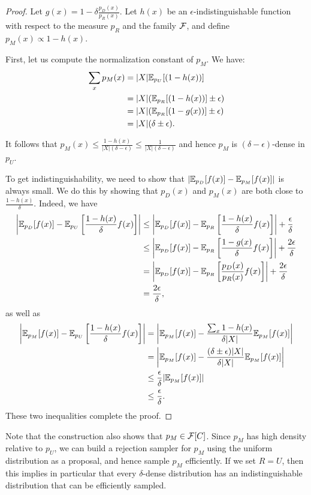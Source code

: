 \documentclass[11pt]{article}
\begin{document}
\begin{proof}
Let $g(x) = 1-\delta\frac{p_D(x)}{p_R(x)}$. Let $h(x)$ be an $\epsilon$-indistinguishable function 
with respect to the measure $p_R$ and the family $\mathcal{F}$, and define $p_M(x) \propto 1-h(x)$.

First, let us compute the normalization constant of $p_M$. We have:
\begin{align*}
\sum_{x} p_M(x) &= |X|\mathbb{E}_{p_U}[(1-h(x))] \\
 &= |X|(\mathbb{E}_{p_R}[(1-h(x))] \pm \epsilon) \\
 &= |X|(\mathbb{E}_{p_R}[(1-g(x))] \pm \epsilon) \\
 &= |X|(\delta \pm \epsilon).
\end{align*}

It follows that $p_M(x) \leq \frac{1-h(x)}{|X|(\delta-\epsilon)} \leq \frac{1}{|X|(\delta-\epsilon)}$ and 
hence $p_M$ is $(\delta-\epsilon)$-dense in $p_U$.

To get indistinguishability, we need to show that $|\mathbb{E}_{p_D}[f(x)]-\mathbb{E}_{p_M}[f(x)]|$ is always small. 
We do this by showing that $p_D(x)$ and $p_M(x)$ are both close to $\frac{1-h(x)}{\delta}$. Indeed, we have
\begin{align*}
\left|\mathbb{E}_{p_D}[f(x)]-\mathbb{E}_{p_U}\left[\frac{1-h(x)}{\delta}f(x)\right]\right| &\leq \left|\mathbb{E}_{p_D}[f(x)]-\mathbb{E}_{p_R}\left[\frac{1-h(x)}{\delta}f(x)\right]\right| + \frac{\epsilon}{\delta} \\
 &\leq \left|\mathbb{E}_{p_D}[f(x)]-\mathbb{E}_{p_R}\left[\frac{1-g(x)}{\delta}f(x)\right]\right| + \frac{2\epsilon}{\delta} \\
 &= \left|\mathbb{E}_{p_D}[f(x)]-\mathbb{E}_{p_R}\left[\frac{p_D(x)}{p_R(x)}f(x)\right]\right| + \frac{2\epsilon}{\delta} \\
 &= \frac{2\epsilon}{\delta},
\end{align*}
as well as
\begin{align*}
\left|\mathbb{E}_{p_M}[f(x)] - \mathbb{E}_{p_U}\left[\frac{1-h(x)}{\delta}f(x)\right]\right| &= \left|\mathbb{E}_{p_M}[f(x)] - \frac{\sum_{x} 1-h(x)}{\delta|X|} \mathbb{E}_{p_M}[f(x)]\right| \\
 &= \left|\mathbb{E}_{p_M}[f(x)] - \frac{(\delta \pm \epsilon)|X|}{\delta |X|} \mathbb{E}_{p_M}[f(x)] \right| \\
 &\leq \frac{\epsilon}{\delta} |\mathbb{E}_{p_M}[f(x)]| \\
 &\leq \frac{\epsilon}{\delta}.
\end{align*}
These two inequalities complete the proof.
\end{proof}

\begin{remark}
Note that the construction also shows that $p_M \in \mathcal{F}[C]$. Since $p_M$ has high density relative to $p_U$, 
we can build a rejection sampler for $p_M$ using the uniform distribution as a proposal, and hence sample $p_M$ 
efficiently. If we set $R = U$, then this implies in particular that every $\delta$-dense distribution has 
an indistinguishable distribution that can be efficiently sampled.
\end{remark}
\end{document}

